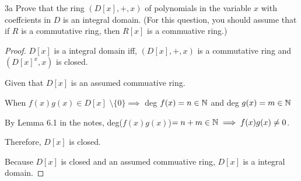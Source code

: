 \begin{question}{3a}
Prove that the ring $(D[x], +, x)$ of polynomials in the variable $x$ with coeffcients in $D$ is an integral domain. (For this question, you should assume that if $R$ is a commutative ring, then $R[x]$ is a commuative ring.)

\begin{proof}
$D[x]$ is a integral domain iff, $(D[x], +, x)$ is a commutative ring and $(D[x]^x, x)$ is closed.

Given that $D[x]$ is an assumed commuative ring.

When $f(x)g(x) \in D[x]$  $\setminus\{0\} \implies$ deg $f(x) = n\in \mathbb{N}$ and deg $g(x) = m \in \mathbb{N}$

By Lemma 6.1 in the notes, deg($f(x)g(x)$)$=n+m \in \mathbb{N} \implies f(x)g(x) \neq 0$.

Therefore, $D[x]$ is closed.

Because $D[x]$ is closed and an assumed commuative ring, $D[x]$ is a integral domain.

\end{proof}
\end{question}

